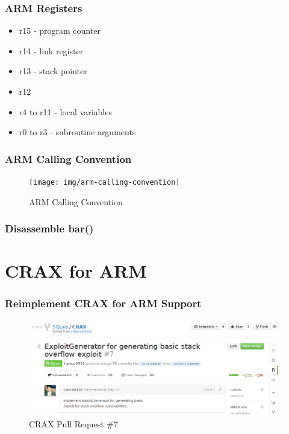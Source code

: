 \documentclass[t,xcolor=table,usenames,dvipsnames]{beamer}
\begin{document}
\begin{frame}
    \frametitle{ARM Registers}
    \begin{itemize}
        \item{r15 - program counter}
        \item{r14 - link register}
        \item{r13 - stack pointer}
        \item{r12}
        \item{r4 to r11 - local variables}
        \item{r0 to r3 - subroutine arguments}
    \end{itemize}
\end{frame}

\begin{frame}
    \frametitle{ARM Calling Convention}
    \begin{figure}
    \texttt{[image: img/arm-calling-convention]}
    \caption{ARM Calling Convention}
    \end{figure}
\end{frame}

\begin{frame}
    \frametitle{Disassemble bar()}
    
\end{frame}

\section{CRAX for ARM}
\begin{frame}
    \sectionpage
\end{frame}

\begin{frame}
    \frametitle{Reimplement CRAX for ARM Support}
    \begin{figure}
    \includegraphics[width=1.0\textwidth]{img/crax-pull-request.png}
    \caption{CRAX Pull Request \#7}
    \end{figure}
\end{frame}
\end{document}

